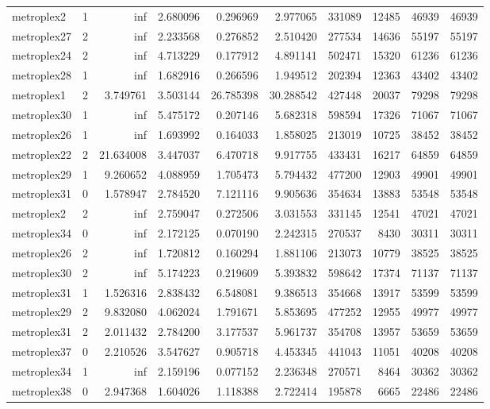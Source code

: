 \documentclass[../../../thesis.tex]{subfiles}
\begin{document}
\begin{longtable}{|l|r|r|r|r|r|r|r|r|r|}
metroplex2 & 1 & inf & 2.680096 & 0.296969 & 2.977065 & 331089 & 12485 & 46939 & 46939 \\
metroplex27 & 2 & inf & 2.233568 & 0.276852 & 2.510420 & 277534 & 14636 & 55197 & 55197 \\
metroplex24 & 2 & inf & 4.713229 & 0.177912 & 4.891141 & 502471 & 15320 & 61236 & 61236 \\
metroplex28 & 1 & inf & 1.682916 & 0.266596 & 1.949512 & 202394 & 12363 & 43402 & 43402 \\
metroplex1 & 2 & 3.749761 & 3.503144 & 26.785398 & 30.288542 & 427448 & 20037 & 79298 & 79298 \\
metroplex30 & 1 & inf & 5.475172 & 0.207146 & 5.682318 & 598594 & 17326 & 71067 & 71067 \\
metroplex26 & 1 & inf & 1.693992 & 0.164033 & 1.858025 & 213019 & 10725 & 38452 & 38452 \\
metroplex22 & 2 & 21.634008 & 3.447037 & 6.470718 & 9.917755 & 433431 & 16217 & 64859 & 64859 \\
metroplex29 & 1 & 9.260652 & 4.088959 & 1.705473 & 5.794432 & 477200 & 12903 & 49901 & 49901 \\
metroplex31 & 0 & 1.578947 & 2.784520 & 7.121116 & 9.905636 & 354634 & 13883 & 53548 & 53548 \\
metroplex2 & 2 & inf & 2.759047 & 0.272506 & 3.031553 & 331145 & 12541 & 47021 & 47021 \\
metroplex34 & 0 & inf & 2.172125 & 0.070190 & 2.242315 & 270537 & 8430 & 30311 & 30311 \\
metroplex26 & 2 & inf & 1.720812 & 0.160294 & 1.881106 & 213073 & 10779 & 38525 & 38525 \\
metroplex30 & 2 & inf & 5.174223 & 0.219609 & 5.393832 & 598642 & 17374 & 71137 & 71137 \\
metroplex31 & 1 & 1.526316 & 2.838432 & 6.548081 & 9.386513 & 354668 & 13917 & 53599 & 53599 \\
metroplex29 & 2 & 9.832080 & 4.062024 & 1.791671 & 5.853695 & 477252 & 12955 & 49977 & 49977 \\
metroplex31 & 2 & 2.011432 & 2.784200 & 3.177537 & 5.961737 & 354708 & 13957 & 53659 & 53659 \\
metroplex37 & 0 & 2.210526 & 3.547627 & 0.905718 & 4.453345 & 441043 & 11051 & 40208 & 40208 \\
metroplex34 & 1 & inf & 2.159196 & 0.077152 & 2.236348 & 270571 & 8464 & 30362 & 30362 \\
metroplex38 & 0 & 2.947368 & 1.604026 & 1.118388 & 2.722414 & 195878 & 6665 & 22486 & 22486 \\

\end{longtable}
\end{document}
